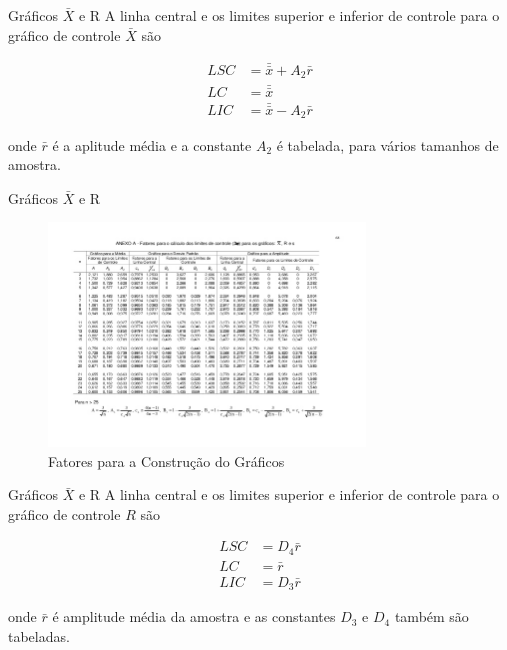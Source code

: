 \documentclass[12pt]{beamer}
\begin{document}
  \begin{frame}[t]{Gráficos $\bar X$ e R}
    A linha central e os limites superior e inferior de controle para o gráfico de controle $\bar X$ são

    \begin{align*}
      LSC & = \bar{\bar x} + A_{2}{\bar{r}}\\
      LC & = \bar{\bar x}\\
      LIC & = \bar{\bar x} - A_{2}{\bar{r}}
    \end{align*}

    onde $\bar{r}$ é a aplitude média e a constante $A_{2}$ é tabelada, para vários tamanhos de amostra.
  \end{frame}

  \begin{frame}{Gráficos $\bar X$ e R}
    \begin{figure}[c]
      \includegraphics[width=0.75\textwidth]{img/tabela-r}
      \caption{Fatores para a Construção do Gráficos}
    \end{figure}
  \end{frame}

  \begin{frame}[t]{Gráficos $\bar X$ e R}
    A linha central e os limites superior e inferior de controle para o gráfico de controle $R$ são

    \begin{align*}
        LSC & = D_4 \bar r\\
        LC & = \bar r\\
        LIC & = D_3 \bar r
    \end{align*}

    onde $\bar r$ é amplitude média da amostra e as constantes $D_3$ e $D_4$ também são tabeladas.
  \end{frame}
\end{document}
